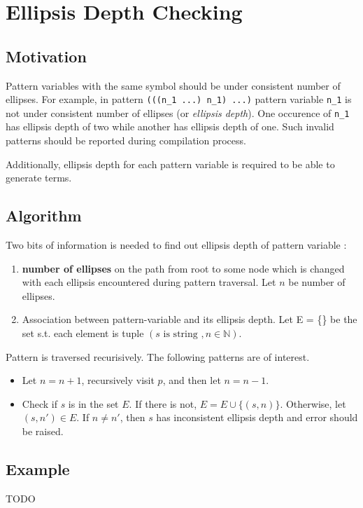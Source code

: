 \section{Ellipsis Depth Checking}

\subsection{Motivation}

Pattern variables with the same symbol should be under consistent number of ellipses. For example, in pattern \texttt{(((n\_1 ...) n\_1) ...)} pattern variable \texttt{n\_1} is not under consistent number of ellipses (or \textit{ellipsis depth}). One occurence of \texttt{n\_1} has ellipsis depth of two while another has ellipsis depth of one. Such invalid patterns should be reported during compilation process.

Additionally, ellipsis depth for each pattern variable is required to be able to generate terms. 

\subsection{Algorithm}
Two bits of information is needed to find out ellipsis depth of pattern variable :

\begin{enumerate}
\item
\textbf{number of ellipses} on the path from root to some node which is changed with each ellipsis encountered during pattern traversal. Let $n$ be number of ellipses.
\item 
Association between pattern-variable and its ellipsis depth. Let E = \{\} be the set s.t. each element is tuple $(s \text{ is string }, n \in \mathbb{N})$.
\end{enumerate}

Pattern is traversed recurisively. The following patterns are of interest.

\begin{itemize}
\item 
\Repeat Let $n=n+1$, recursively visit $p$, and then let $n=n-1$.

\item
\BuiltInPattern Check if $s$ is in the set $E$. If there is not, $E = E \cup \{ (s, n) \}$. Otherwise, let $(s, n\prime) \in E$. If $n \neq n\prime$, then $s$ has inconsistent ellipsis depth and error should be raised.
\end{itemize}

\subsection{Example}

TODO
